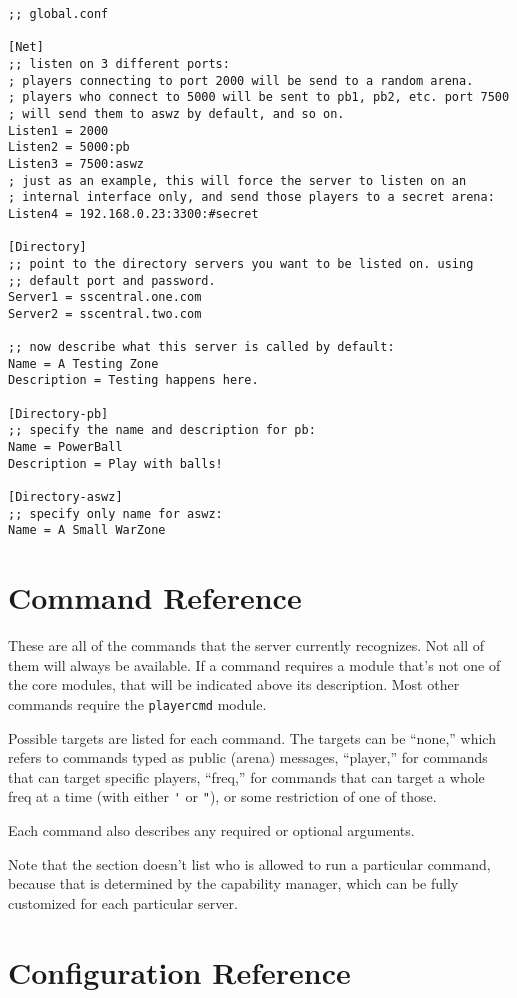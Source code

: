 \documentclass{article}
\begin{document}
\begin{verbatim}
;; global.conf

[Net]
;; listen on 3 different ports:
; players connecting to port 2000 will be send to a random arena.
; players who connect to 5000 will be sent to pb1, pb2, etc. port 7500
; will send them to aswz by default, and so on.
Listen1 = 2000
Listen2 = 5000:pb
Listen3 = 7500:aswz
; just as an example, this will force the server to listen on an
; internal interface only, and send those players to a secret arena:
Listen4 = 192.168.0.23:3300:#secret

[Directory]
;; point to the directory servers you want to be listed on. using
;; default port and password.
Server1 = sscentral.one.com
Server2 = sscentral.two.com

;; now describe what this server is called by default:
Name = A Testing Zone
Description = Testing happens here.

[Directory-pb]
;; specify the name and description for pb:
Name = PowerBall
Description = Play with balls!

[Directory-aswz]
;; specify only name for aswz:
Name = A Small WarZone
\end{verbatim}


\section{Command Reference}

These are all of the commands that the server currently recognizes. Not
all of them will always be available. If a command requires a module
that's not one of the core modules, that will be indicated above its
description. Most other commands require the \texttt{playercmd} module.

Possible targets are listed for each command. The targets can be
``none,'' which refers to commands typed as public (arena) messages,
``player,'' for commands that can target specific players, ``freq,'' for
commands that can target a whole freq at a time (with either \verb/'/ or
\verb/"/), or some restriction of one of those.

Each command also describes any required or optional arguments.

Note that the section doesn't list who is allowed to run a particular
command, because that is determined by the capability manager, which can
be fully customized for each particular server.




\section{Configuration Reference}
\end{document}
